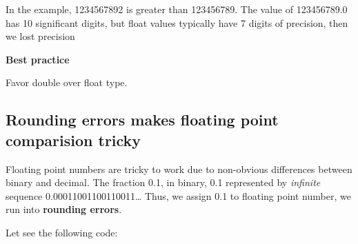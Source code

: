 \documentclass[
  letterpaper,
  DIV=11,
  numbers=noendperiod]{scrreprt}
\begin{document}
In the example, 1234567892 is greater than 123456789. The value of
123456789.0 has 10 significant digits, but float values typically have 7
digits of precision, then we lost precision

\begin{tcolorbox}[enhanced jigsaw, toprule=.15mm, rightrule=.15mm, opacityback=0, breakable, leftrule=.75mm, colback=white, colframe=quarto-callout-tip-color-frame, arc=.35mm, left=2mm, bottomrule=.15mm]
\begin{minipage}[t]{5.5mm}
\textcolor{quarto-callout-tip-color}{\faLightbulb}
\end{minipage}%
\begin{minipage}[t]{\textwidth - 5.5mm}

\textbf{Best practice}\vspace{2mm}

Favor double over float type.

\end{minipage}%
\end{tcolorbox}

\hypertarget{rounding-errors-makes-floating-point-comparision-tricky}{%
\subsection{Rounding errors makes floating point comparision
tricky}\label{rounding-errors-makes-floating-point-comparision-tricky}}

Floating point numbers are tricky to work due to non-obvious differences
between binary and decimal. The fraction 0.1, in binary, 0.1 represented
by \emph{infinite} sequence 0.00011001100110011\ldots{} Thus, we assign
0.1 to floating point number, we run into \textbf{rounding errors}.

Let see the following code:
\end{document}
